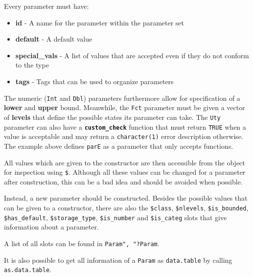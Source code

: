 \documentclass[
  11pt,
  parskip=half,
  DIV=calc,
  BCOR=10mm,
  x11names]{scrbook}
\newenvironment{Shaded}{}{}
\newcommand{\NormalTok}[1]{#1}
\newcommand{\OperatorTok}[1]{#1}
\providecommand{\tightlist}{%
  \setlength{\itemsep}{0pt}\setlength{\parskip}{0pt}}
\begin{document}
Every parameter must have:

\begin{itemize}
\tightlist
\item
  \textbf{id} - A name for the parameter within the parameter set
\item
  \textbf{default} - A default value
\item
  \textbf{special\_vals} - A list of values that are accepted even if they do not conform to the type
\item
  \textbf{tags} - Tags that can be used to organize parameters
\end{itemize}

The numeric (\texttt{Int} and \texttt{Dbl}) parameters furthermore allow for specification of a \textbf{lower} and \textbf{upper} bound.
Meanwhile, the \texttt{Fct} parameter must be given a vector of \textbf{levels} that define the possible states its parameter can take.
The \texttt{Uty} parameter can also have a \textbf{\texttt{custom\_check}} function that must return \texttt{TRUE} when a value is acceptable and may return a \texttt{character(1)} error description otherwise.
The example above defines \texttt{parE} as a parameter that only accepts functions.

All values which are given to the constructor are then accessible from the object for inspection using \texttt{\$}.
Although all these values can be changed for a parameter after construction, this can be a bad idea and should be avoided when possible.

Instead, a new parameter should be constructed.
Besides the possible values that can be given to a constructor, there are also the \texttt{\$class}, \texttt{\$nlevels}, \texttt{\$is\_bounded}, \texttt{\$has\_default}, \texttt{\$storage\_type}, \texttt{\$is\_number} and \texttt{\$is\_categ} slots that give information about a parameter.

A list of all slots can be found in \texttt{Param",\ "?Param}.

\begin{Shaded}
\end{Shaded}

It is also possible to get all information of a \texttt{Param} as \texttt{data.table} by calling \texttt{as.data.table}.
\end{document}
